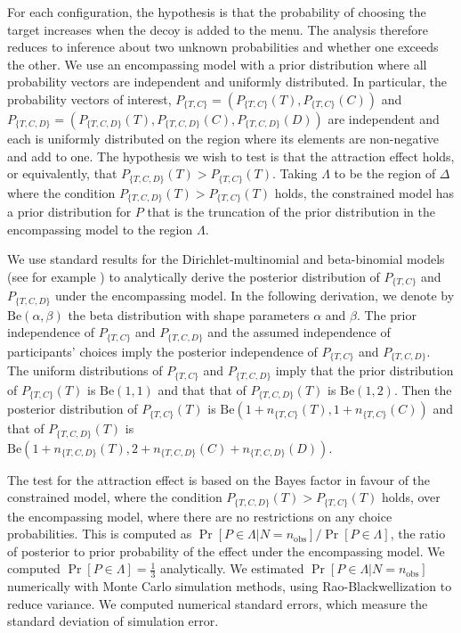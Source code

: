 \documentclass[11pt,letter]{article}
\begin{document}
For each configuration, the hypothesis is that the probability of choosing the target increases when the decoy is added to the menu.
The analysis therefore reduces to inference about two unknown probabilities and whether one exceeds the other.
We use an encompassing model with a prior distribution where all probability vectors are independent and uniformly distributed.
In particular, the probability vectors of interest, $P_{\{T,C\}} = (P_{\{T,C\}}(T), P_{\{T,C\}}(C))$ and $P_{\{T,C,D\}} = (P_{\{T,C,D\}}(T), P_{\{T,C,D\}}(C), P_{\{T,C,D\}}(D))$ are independent and each is uniformly distributed on the region where its elements are non-negative and add to one.
The hypothesis we wish to test is that the attraction effect holds, or equivalently, that $P_{\{T,C,D\}}(T) > P_{\{T,C\}}(T)$.
Taking $\Lambda$ to be the region of $\Delta$ where the condition $P_{\{T,C,D\}}(T) > P_{\{T,C\}}(T)$ holds, the constrained model has a prior distribution for $P$ that is the truncation of the prior distribution in the encompassing model to the region $\Lambda$.

We use standard results for the Dirichlet-multinomial and beta-binomial models (see for example \citet{gelman:95}) to analytically derive the posterior distribution of $P_{\{T,C\}}$ and $P_{\{T,C,D\}}$ under the encompassing model.
In the following derivation, we denote by $\mathrm{Be}(\alpha,\beta)$ the beta distribution with shape parameters $\alpha$ and $\beta$.
The prior independence of $P_{\{T,C\}}$ and $P_{\{T,C,D\}}$ and the assumed independence of participants' choices imply the posterior independence of $P_{\{T,C\}}$ and $P_{\{T,C,D\}}$.
The uniform distributions of $P_{\{T,C\}}$ and $P_{\{T,C,D\}}$ imply that the prior distribution of $P_{\{T,C\}}(T)$ is $\mathrm{Be}(1,1)$ and that that of $P_{\{T,C,D\}}(T)$ is $\mathrm{Be}(1,2)$.
Then the posterior distribution of $P_{\{T,C\}}(T)$ is $\mathrm{Be}(1 + n_{\{T,C\}}(T), 1 + n_{\{T,C\}}(C))$ and that of $P_{\{T,C,D\}}(T)$ is $\mathrm{Be}(1 + n_{\{T,C,D\}}(T), 2 + n_{\{T,C,D\}}(C) + n_{\{T,C,D\}}(D))$.

The test for the attraction effect is based on the Bayes factor in favour of the constrained model, where the condition $P_{\{T,C,D\}}(T) > P_{\{T,C\}}(T)$ holds, over the encompassing model, where there are no restrictions on any choice probabilities.
This is computed as $\Pr[P \in \Lambda|N = n_{\mathrm{obs}}]/\Pr[P \in \Lambda]$, the ratio of posterior to prior probability of the effect under the encompassing model.
We computed $\Pr[P \in \Lambda] = \tfrac{1}{3}$ analytically.
We estimated $\Pr[P \in \Lambda|N = n_{\mathrm{obs}}]$ numerically with Monte Carlo simulation methods, using Rao-Blackwellization to reduce variance.
We computed numerical standard errors, which measure the standard deviation of simulation error.
\end{document}
